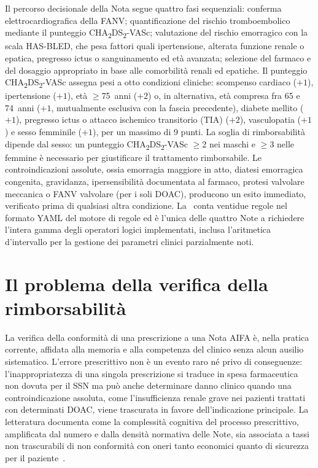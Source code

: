 Il percorso decisionale della Nota segue quattro fasi sequenziali: conferma
elettrocardiografica della FANV; quantificazione del rischio tromboembolico
mediante il punteggio CHA\textsubscript{2}DS\textsubscript{2}-VASc; valutazione
del rischio emorragico con la scala HAS-BLED, che pesa fattori quali ipertensione, alterata funzione renale o epatica, pregresso ictus o sanguinamento ed età avanzata; selezione del farmaco e del
dosaggio appropriato in base alle comorbilità renali ed epatiche.
Il punteggio CHA\textsubscript{2}DS\textsubscript{2}-VASc assegna pesi a otto
condizioni cliniche: scompenso cardiaco ($+1$), ipertensione ($+1$), età
$\geq$75~anni ($+2$) o, in alternativa, età compresa fra 65 e 74~anni ($+1$,
mutualmente esclusiva con la fascia precedente), diabete mellito ($+1$),
pregresso ictus o attacco ischemico transitorio (TIA) ($+2$),
vasculopatia ($+1$) e sesso femminile ($+1$), per un massimo di 9 punti.
La soglia di rimborsabilità dipende dal sesso: un punteggio
CHA\textsubscript{2}DS\textsubscript{2}-VASc $\geq$2 nei maschi e $\geq$3 nelle
femmine è necessario per giustificare il trattamento rimborsabile.
Le controindicazioni assolute, ossia emorragia maggiore in atto, diatesi emorragica
congenita, gravidanza, ipersensibilità documentata al farmaco, protesi valvolare
meccanica o FANV valvolare (per i soli DOAC), producono un esito
 immediato, verificato prima di qualsiasi altra
condizione.
La \notenova\ conta ventidue regole nel formato YAML del motore di regole ed è
l'unica delle quattro Note a richiedere l'intera gamma degli operatori logici
implementati, inclusa l'aritmetica d'intervallo per la gestione dei parametri
clinici parzialmente noti.

\section{Il problema della verifica della rimborsabilità}
\label{sec:problema-verifica}

La verifica della conformità di una prescrizione a una Nota AIFA è, nella pratica
corrente, affidata alla memoria e alla competenza del clinico senza alcun ausilio
sistematico.
L'errore prescrittivo non è un evento raro né privo di conseguenze: l'inappropriatezza
di una singola prescrizione si traduce in spesa farmaceutica non dovuta per il SSN
ma può anche determinare danno clinico quando una controindicazione assoluta,
come l'insufficienza renale grave nei pazienti trattati con determinati DOAC,
viene trascurata in favore dell'indicazione principale.
La letteratura documenta come la complessità cognitiva del processo prescrittivo,
amplificata dal numero e dalla densità normativa delle Note, sia associata a tassi
non trascurabili di non conformità con oneri tanto economici quanto di sicurezza
per il paziente~\cite{berner2007cdss}.

